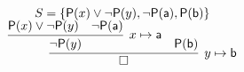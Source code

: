 
\begin{gather*}
	\vspace{-1em}
	S = 
	\{ 
	\mP(x) \lor \lnot\mP(y), 
	\lnot \mP(\ma), 
	\mP(\mb) 
	\}\\[0.5em]
\infer[y\mapsto\mb]{\emptyclause}{
\infer[x\mapsto\ma]{\lnot\mP(y)}{\mP(x)\lor \lnot \mP(y) & \lnot\mP(\ma)} & \mP(\mb)
	}
			\end{gather*}